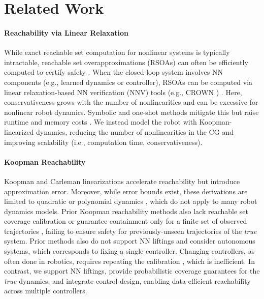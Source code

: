 \section{Related Work}
\label{related_work}

\paragraph{Reachability via Linear Relaxation}
While exact reachable set computation for nonlinear systems is typically intractable, reachable set overapproximations (RSOAs) can often be efficiently computed to certify safety \citep{DBLP:journals/arcras/AlthoffFG21}. When the closed-loop system involves NN components (e.g., learned dynamics or controller), RSOAs can be computed via linear relaxation-based NN verification (NNV) tools (e.g., CROWN \citep{Zhang2018CROWN}) \citep{Zhang2018CROWN, Everett2021NFL, Jafarpour2024AkashNFL}. Here, conservativeness grows with the number of nonlinearities \citep{sage-mp} and can be excessive for nonlinear robot dynamics. Symbolic and one-shot methods mitigate this but raise runtime and memory costs \citep{Chen2023One-Shot, Rober2024CARV, Everett2021NFL}. We instead model the robot with Koopman-linearized dynamics, reducing the number of nonlinearities in the CG and improving scalability (i.e., computation time, conservativeness).

\paragraph{Koopman Reachability}
Koopman \citep{koopman_theory} and Carleman \citep{doi:10.1137/1.9781611976847.1, Bayer2023} linearizations accelerate reachability but introduce approximation error. Moreover, while error bounds exist, these derivations are limited to quadratic or polynomial dynamics \citep{DBLP:journals/pnas/LiuKKLTC21, DBLP:journals/corr/abs-1711-02552, doi:10.1137/1.9781611976847.1}, which do not apply to many robot dynamics models. Prior Koopman reachability methods also lack reachable set coverage calibration \citep{DBLP:journals/access/ThapliyalH22} or guarantee containment only for a finite set of observed trajectories \citep{DBLP:conf/cdc/KochdumperB22}, failing to ensure safety for previously-unseen trajectories of the \textit{true} system. Prior methods also do not support NN liftings and consider autonomous systems, which corresponds to fixing a single controller. Changing controllers, as often done in robotics, requires repeating the calibration \citep{DBLP:conf/rp/ForetsS21, DBLP:conf/adhs/BakBDGP21, DBLP:journals/fmsd/BakBHKLP25}, which is inefficient. In contrast, we support NN liftings, provide probabilistic coverage guarantees for the \textit{true} dynamics, and integrate control design, enabling data-efficient reachability across multiple controllers.

